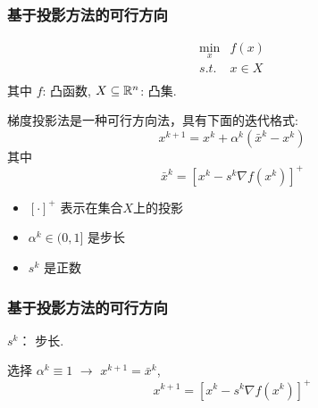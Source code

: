 \documentclass[handout,10pt]{beamer}
\begin{document}
	\begin{frame}
		\frametitle{基于投影方法的可行方向}
		
		\begin{equation}
			\begin{array}{cl}
				\min_x & f(x) \\
				s.t. & x\in X\\
			\end{array}
		\end{equation}
		其中 $f$: 凸函数, $X\subseteq \mathbb{R}^n$: 凸集. 
		
		梯度投影法是一种可行方向法，具有下面的迭代格式: %
		$$
		x^{k+1}=x^{k}+\alpha^{k}\left(\bar{x}^{k}-x^{k}\right)
		$$
		其中
		$$
		\bar{x}^{k}=\left[x^{k}-s^{k} \nabla f\left(x^{k}\right)\right]^{+}
		$$
		
		\begin{itemize}
			\item $[\cdot]^{+}$ 表示在集合$X$上的投影
			\item $\alpha^{k} \in(0,1]$ 是步长
			\item $s^{k}$ 是正数
		\end{itemize}
	\end{frame}
	\begin{frame}
		\frametitle{基于投影方法的可行方向}
		$s^{k}$： 步长.
		
		
		选择 $\alpha^{k} \equiv 1$
		$\rightarrow$ $x^{k+1}=\bar{x}^{k}$,
		$$
		x^{k+1}=\left[x^{k}-s^{k} \nabla f\left(x^{k}\right)\right]^{+}
		$$
		
	\end{frame}
\end{document}
